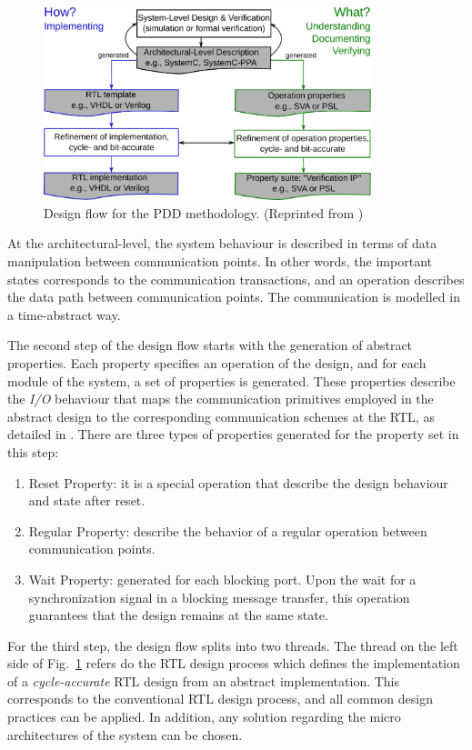 \begin{figure}[htb!]
	\centering
	\includegraphics[width=0.85\textwidth]{images/design-flow.pdf}
	\caption{Design flow for the PDD methodology. (Reprinted from \cite{paper-pdd})}
	\label{fig:pdd-flow}
\end{figure}

At the architectural-level, the system behaviour is described in terms of data manipulation between communication points. In other words, the important states corresponds to the communication transactions, and an operation describes the data path between communication points. The communication is modelled in a time-abstract way. 

The second step of the design flow starts with the generation of abstract properties. Each property specifies an operation of the design, and for each module of the system, a set of properties is generated. These properties describe the \textit{I/O} behaviour that maps the communication primitives employed in the abstract design to the corresponding communication schemes at the RTL, as detailed in \cite{paper-pdd}. There are three types of properties generated for the property set in this step:

\begin{enumerate}
\item Reset Property: it is a special operation that describe the design behaviour and state after reset.
\item Regular Property: describe the behavior of a regular operation between communication points.
\item Wait Property: generated for each blocking port. Upon the wait for a synchronization signal in a blocking message transfer, this operation guarantees that the design remains at the same state.
\end{enumerate}

For the third step, the design flow splits into two threads. The thread on the left side of Fig.~\ref{fig:pdd-flow} refers do the RTL design process which defines the implementation of a \textit{cycle-accurate} RTL design from an abstract implementation. This corresponds to the conventional RTL design process, and all common design practices can be applied. In addition, any solution regarding the micro architectures of the system can be chosen.

